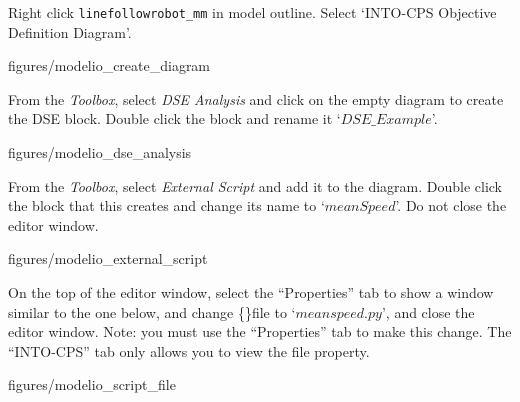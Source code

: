 \documentclass[11pt,a4paper]{../tutorial}
\begin{document}
\begin{instructions}
\item Right click \verb=linefollowrobot_mm= in model outline. Select `INTO-CPS \menusep Objective Definition Diagram'.

\begin{center}
\begin{annotation}[width=0.7\linewidth]{figures/modelio_create_diagram}
    \end{annotation}
\end{center}

\newpage

\item From the \emph{Toolbox}, select \emph{DSE Analysis} and click on the empty diagram to create the DSE block.  Double click the block and rename it `$DSE\_Example$'.

\begin{center}
\begin{annotation}[width=0.7\linewidth]{figures/modelio_dse_analysis}
    \end{annotation}
\end{center}

\item \label{start_script_instructions} From the \emph{Toolbox}, select \emph{External Script} and add it to the diagram. Double click the block that this creates and change its name to `$meanSpeed$'. Do not close the editor window.

\begin{center}
\begin{annotation}[width=0.7\linewidth]{figures/modelio_external_script}
    \end{annotation}
\end{center}

\item On the top of the editor window, select the ``Properties'' tab to show a window similar to the one below, and change \{\}file to `$meanspeed.py$', and close the editor window. Note: you must use the ``Properties'' tab to make this change. The ``INTO-CPS'' tab only allows you to view the file property.

\begin{center}
	\begin{annotation}[width=0.7\linewidth]{figures/modelio_script_file}
	\end{annotation}
\end{center}


\end{instructions}
\end{document}
